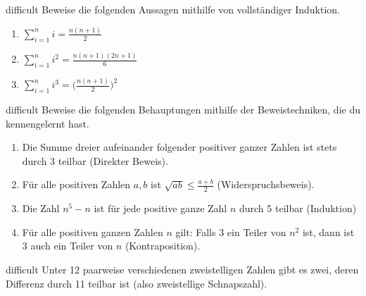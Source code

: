 \documentclass[../aussagenlogik.tex]{subfiles}
\begin{document}
\begin{exercise}{difficult}
    Beweise die folgenden Aussagen mithilfe von vollständiger Induktion.
    \begin{multicols}{3}
        \begin{enumerate}
            \item $\displaystyle\sum_{i=1}^ni=\frac{n(n+1)}{2}$
            \item $\displaystyle\sum_{i=1}^ni^2=\frac{n(n+1)(2n+1)}{6}$
            \item $\displaystyle\sum_{i=1}^ni^3=\biggl(\frac{n(n+1)}{2}\biggr)^2$
        \end{enumerate}
    \end{multicols}
\end{exercise}
\begin{exercise}{difficult}
    Beweise die folgenden Behauptungen mithilfe der Beweistechniken, die du kennengelernt hast.
    \begin{enumerate}
        \item Die Summe dreier aufeinander folgender positiver ganzer Zahlen ist stets durch 3 teilbar (Direkter Beweis).
        \item Für alle positiven Zahlen $a,b$ ist $\sqrt{ab}\leq\frac{a+b}{2}$ (Widerspruchsbeweis).
        \item Die Zahl $n^5-n$ ist für jede positive ganze Zahl $n$ durch 5 teilbar (Induktion)
        \item Für alle positiven ganzen Zahlen $n$ gilt: Falls $3$ ein Teiler von $n^2$ ist, dann ist $3$ auch ein Teiler von $n$ (Kontraposition).
    \end{enumerate}
\end{exercise}
\begin{exercise}{difficult}
    Unter 12 paarweise verschiedenen zweistelligen Zahlen gibt es zwei, deren Differenz durch 11 teilbar ist (also zweistellige Schnapszahl).
\end{exercise}
\end{document}
